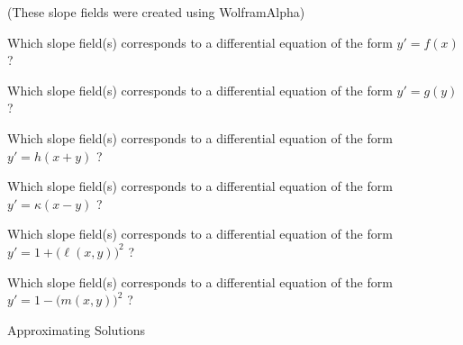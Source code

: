 \hfill {\footnotesize(These slope fields were created using WolframAlpha)} \\


\begin{parts}
	\item Which slope field(s) corresponds to a differential equation of the form
		\qquad $y'=f(x)$ \qquad ?	

	\item Which slope field(s) corresponds to a differential equation of the form
		\qquad $y'=g(y)$ \qquad ?	

	\item Which slope field(s) corresponds to a differential equation of the form
		\qquad $y'=h(x+y)$ \qquad ?	

	\item Which slope field(s) corresponds to a differential equation of the form
		\qquad $y'=\kappa(x-y)$ \qquad ?	

	\item Which slope field(s) corresponds to a differential equation of the form
		\qquad $y'=1+\big( \ell(x,y) \big)^2$ \qquad ?	

	\item Which slope field(s) corresponds to a differential equation of the form
		\qquad $y'=1-\big( m(x,y) \big)^2$ \qquad ?	

\end{parts}






\standardonlynewpage





%
%



\begin{module}{Approximating Solutions}
	\label{ODE:approximation}

	
	
\end{module}



